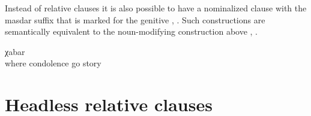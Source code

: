 Instead of relative clauses it is also possible to have a nominalized clause with the masdar suffix that is marked for the genitive , . Such constructions are semantically equivalent to the noun-modifying construction above , . 
%
\begin{exe}
	\ex	\label{ex:the story how we went somewhere for condolence}
		χabar\\
		where	condolence	go	story\\
	\glt	{}
\end{exe}



\section{Headless relative clauses}
\label{sec:Headless relative clauses}

